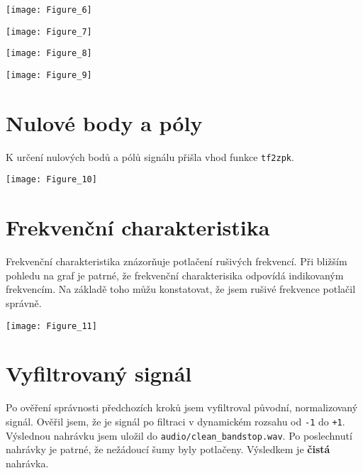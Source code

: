 \documentclass[10pt,a4paper,twocolumn]{article}
\begin{document}
	\hspace*{-0.8cm}
	\texttt{[image: Figure\_6]}
	
	\hspace*{-0.8cm}
	\texttt{[image: Figure\_7]}
	
	\hspace*{-0.8cm}
	\texttt{[image: Figure\_8]}
	
	\hspace*{-0.5cm} 
	\texttt{[image: Figure\_9]}
	
	\section{Nulové body a póly}
	K určení nulových bodů a pólů signálu přišla vhod funkce \texttt{tf2zpk}.
	
	\texttt{[image: Figure\_10]}
	
	\section{Frekvenční charakteristika}
	Frekvenční charakteristika znázorňuje potlačení rušivých frekvencí. Při bližším pohledu na graf je patrné, že frekvenční charakterisika odpovídá indikovaným frekvencím. Na základě toho můžu konstatovat, že jsem rušivé frekvence potlačil správně.
	
	\hspace*{-0.5cm} 
	\texttt{[image: Figure\_11]}
	
	\section{Vyfiltrovaný signál}
	Po ověření správnosti předchozích kroků jsem vyfiltroval původní, normalizovaný signál. Ověřil jsem, že je signál po filtraci v dynamickém rozsahu od \texttt{-1} do \texttt{+1}. Výslednou nahrávku jsem uložil do \texttt{audio/clean\_bandstop.wav}. Po poslechnutí nahrávky je patrné, že nežádoucí šumy byly potlačeny. Výsledkem je \textbf{čistá} nahrávka.
	
\end{document}
